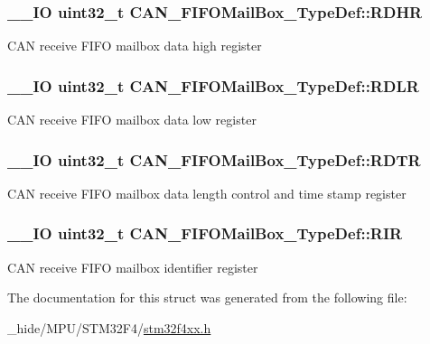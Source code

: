 \subsubsection[{R\+D\+H\+R}]{\setlength{\rightskip}{0pt plus 5cm}\+\_\+\+\_\+\+I\+O uint32\+\_\+t C\+A\+N\+\_\+\+F\+I\+F\+O\+Mail\+Box\+\_\+\+Type\+Def\+::\+R\+D\+H\+R}\label{struct_c_a_n___f_i_f_o_mail_box___type_def_a95890984bd67845015d40e82fb091c93}
C\+A\+N receive F\+I\+F\+O mailbox data high register \hypertarget{struct_c_a_n___f_i_f_o_mail_box___type_def_ac7d62861de29d0b4fcf11fabbdbd76e7}{}
\subsubsection[{R\+D\+L\+R}]{\setlength{\rightskip}{0pt plus 5cm}\+\_\+\+\_\+\+I\+O uint32\+\_\+t C\+A\+N\+\_\+\+F\+I\+F\+O\+Mail\+Box\+\_\+\+Type\+Def\+::\+R\+D\+L\+R}\label{struct_c_a_n___f_i_f_o_mail_box___type_def_ac7d62861de29d0b4fcf11fabbdbd76e7}
C\+A\+N receive F\+I\+F\+O mailbox data low register \hypertarget{struct_c_a_n___f_i_f_o_mail_box___type_def_a49d74ca8b402c2b9596bfcbe4cd051a9}{}
\subsubsection[{R\+D\+T\+R}]{\setlength{\rightskip}{0pt plus 5cm}\+\_\+\+\_\+\+I\+O uint32\+\_\+t C\+A\+N\+\_\+\+F\+I\+F\+O\+Mail\+Box\+\_\+\+Type\+Def\+::\+R\+D\+T\+R}\label{struct_c_a_n___f_i_f_o_mail_box___type_def_a49d74ca8b402c2b9596bfcbe4cd051a9}
C\+A\+N receive F\+I\+F\+O mailbox data length control and time stamp register \hypertarget{struct_c_a_n___f_i_f_o_mail_box___type_def_a034504d43f7b16b320745a25b3a8f12d}{}
\subsubsection[{R\+I\+R}]{\setlength{\rightskip}{0pt plus 5cm}\+\_\+\+\_\+\+I\+O uint32\+\_\+t C\+A\+N\+\_\+\+F\+I\+F\+O\+Mail\+Box\+\_\+\+Type\+Def\+::\+R\+I\+R}\label{struct_c_a_n___f_i_f_o_mail_box___type_def_a034504d43f7b16b320745a25b3a8f12d}
C\+A\+N receive F\+I\+F\+O mailbox identifier register 

The documentation for this struct was generated from the following file\+:\begin{DoxyCompactItemize}
\item 
\+\_\+hide/\+M\+P\+U/\+S\+T\+M32\+F4/\hyperlink{stm32f4xx_8h}{stm32f4xx.\+h}\end{DoxyCompactItemize}
